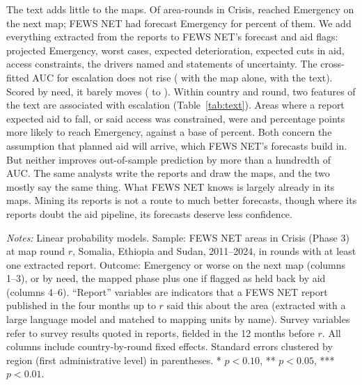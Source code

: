 \documentclass[11pt]{article}
\begin{document}
\begin{appendices}
The text adds little to the maps. Of \txtEscN{} area-rounds in Crisis, \txtEscEvents{} reached Emergency on the next map; FEWS NET had forecast Emergency for \txtEscFcFour{} percent of them. We add everything extracted from the reports to FEWS NET's forecast and aid flags: projected Emergency, worst cases, expected deterioration, expected cuts in aid, access constraints, the drivers named and statements of uncertainty. The cross-fitted AUC for escalation does not rise (\txtAucMap{} with the map alone, \txtAucMapText{} with the text). Scored by need, it barely moves (\txtAucNeed{} to \txtAucNeedText{}). Within country and round, two features of the text are associated with escalation (Table~\ref{tab:text}). Areas where a report expected aid to fall, or said access was constrained, were \txtAidDown{} and \txtAccess{} percentage points more likely to reach Emergency, against a base of \nsEscBase{} percent. Both concern the assumption that planned aid will arrive, which FEWS NET's forecasts build in. But neither improves out-of-sample prediction by more than a hundredth of AUC. The same analysts write the reports and draw the maps, and the two mostly say the same thing. What FEWS NET knows is largely already in its maps. Mining its reports is not a route to much better forecasts, though where its reports doubt the aid pipeline, its forecasts deserve less confidence.


\begin{table}[htbp]
\centering
\caption{Do FEWS NET's reports predict escalation from Crisis to Emergency beyond its maps?}\label{tab:text}
\scriptsize
\resizebox{\textwidth}{!}{}
\par\vspace{4pt}\begin{minipage}{\textwidth}\scriptsize \textit{Notes:} Linear probability models. Sample: FEWS NET areas in Crisis (Phase 3) at map round $r$, Somalia, Ethiopia and Sudan, 2011--2024, in rounds with at least one extracted report. Outcome: Emergency or worse on the next map (columns 1--3), or by need, the mapped phase plus one if flagged as held back by aid (columns 4--6). ``Report'' variables are indicators that a FEWS NET report published in the four months up to $r$ said this about the area (extracted with a large language model and matched to mapping units by name). Survey variables refer to survey results quoted in reports, fielded in the 12 months before $r$. All columns include country-by-round fixed effects. Standard errors clustered by region (first administrative level) in parentheses. * $p<0.10$, ** $p<0.05$, *** $p<0.01$.
\end{minipage}
\end{table}


\end{appendices}
\end{document}
